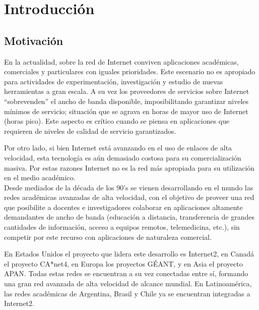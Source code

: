 
\chapter{Introducci\'on}

\ifpdf
    \graphicspath{{Chapter1/Figs/Raster/}{Chapter1/Figs/PDF/}{Chapter2/Figs/}}
\else
    \graphicspath{{Chapter1/Figs/Vector/}{Chapter1/Figs/}}
\fi


\section{Motivación}

En la actualidad, sobre la red de Internet conviven aplicaciones académicas, comerciales y particulares con iguales prioridades. Este escenario no es apropiado para actividades de experimentación, investigación y estudio de nuevas herramientas a gran escala. A su vez los proveedores de servicios sobre Internet “sobrevenden” el ancho de banda disponible, imposibilitando garantizar niveles mínimos de servicio; situación que se agrava en horas de mayor uso de Internet (horas pico). Este aspecto es crítico cuando se piensa en aplicaciones que requieren de niveles de calidad de servicio garantizados.

Por otro lado, si bien Internet está avanzando en el uso de enlaces de alta velocidad, esta tecnología es aún demasiado costosa para su comercialización masiva.
Por estas razones Internet no es la red más apropiada para su utilización en el medio académico.\\ 

Desde mediados de la década de los 90’s se vienen desarrollando en el mundo las redes académicas avanzadas de alta velocidad, con el objetivo de proveer una red que posibilite a docentes e investigadores colaborar en aplicaciones altamente demandantes de ancho de banda (educación a distancia, transferencia de grandes cantidades de información, acceso a equipos remotos, telemedicina, etc.), sin competir por este recurso con aplicaciones de naturaleza comercial.

En Estados Unidos el proyecto que lidera este desarrollo es Internet2, en Canadá el proyecto CA*net4, en Europa los proyectos GÉANT, y en Asia el proyecto APAN. Todas estas redes se encuentran a su vez conectadas entre sí, formando una gran red avanzada de alta velocidad de alcance mundial. En Latinoamérica, las redes académicas de Argentina, Brasil y Chile ya se encuentran integradas a Internet2.\\

